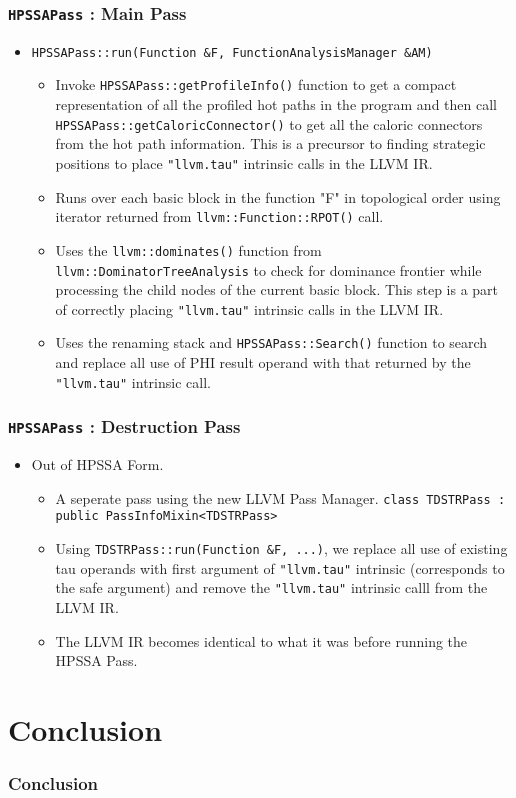 \documentclass[aspectratio=169]{beamer}
\begin{document}
\begin{frame}
	\frametitle{\texttt{HPSSAPass} : Main Pass}
	\begin{itemize}
		\item \texttt{HPSSAPass::run(Function &F, FunctionAnalysisManager &AM)} 
		\begin{itemize}
			\footnotesize
			\item Invoke \texttt{HPSSAPass::getProfileInfo()} function to get a compact representation of all the profiled \color{red} hot paths \color{black} in the program and then call \texttt{HPSSAPass::getCaloricConnector()} to get all the caloric connectors from the \color{red} hot path \color{black} information. This is a precursor to finding strategic positions to place \texttt{"llvm.tau"} intrinsic calls in the LLVM IR.
			\item Runs over each basic block in the function "F" in topological order using iterator returned from \texttt{llvm::Function::RPOT()} call.
			\item Uses the \texttt{llvm::dominates()} function from \texttt{llvm::DominatorTreeAnalysis} to check for dominance frontier while processing the child nodes of the current basic block. This step is a part of correctly placing \texttt{"llvm.tau"} intrinsic calls in the LLVM IR. 
			\item Uses the renaming stack and \texttt{HPSSAPass::Search()} function to search and replace all use of PHI result operand with that returned by the \texttt{"llvm.tau"} intrinsic call.
		\end{itemize}
	\end{itemize}
\end{frame}

\begin{frame}
	\frametitle{\texttt{HPSSAPass} : Destruction Pass}
	\begin{itemize}
		\item Out of HPSSA Form. 
		\begin{itemize}
			\item A seperate pass using the new LLVM Pass Manager. \texttt{class TDSTRPass : public PassInfoMixin<TDSTRPass>}
			\item Using \texttt{TDSTRPass::run(Function &F, ...)}, we replace all use of existing tau operands with first argument of  \texttt{"llvm.tau"} intrinsic (corresponds to the safe argument) and remove the \texttt{"llvm.tau"} intrinsic calll from the LLVM IR.
			\item The LLVM IR becomes identical to what it was before running the HPSSA Pass. 
		\end{itemize}
	\end{itemize}
\end{frame}

\footnotesize

\section{Conclusion}
\begin{frame}
	\frametitle{Conclusion}
\end{frame}
\footnotesize
\end{document}
